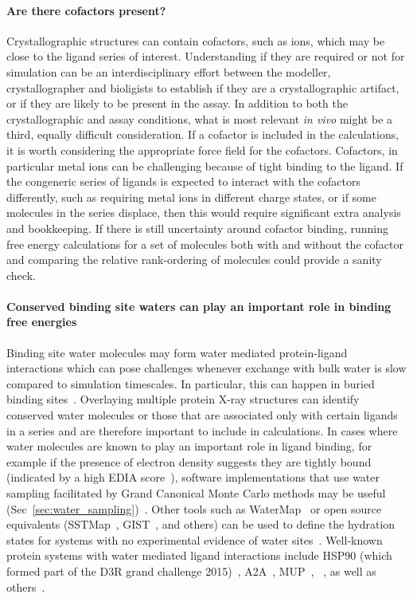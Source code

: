 \documentclass[9pt,bestpractices]{livecoms}
\begin{document}
\paragraph{Are there cofactors present?}
Crystallographic structures can contain cofactors, such as ions, which may be close to the ligand series of interest. Understanding if they are required or not for simulation can be an interdisciplinary effort between the modeller, crystallographer and bioligists to establish if they are a crystallographic artifact, or if they are likely to be present in the assay. In addition to both the crystallographic and assay conditions, what is most relevant \textit{in vivo} might be a third, equally difficult consideration. If a cofactor is included in the calculations, it is worth considering the appropriate force field for the cofactors. Cofactors, in particular metal ions can be challenging\cite{mobley2017predicting, guven2024protocols} because of tight binding to the ligand.  If the congeneric series of ligands is expected to interact with the cofactors differently, such as requiring metal ions in different charge states, or if some molecules in the series displace, then this would require significant extra analysis and bookkeeping. If there is still uncertainty around cofactor binding, running free energy calculations for a set of molecules both with and without the cofactor and comparing the relative rank-ordering of molecules could provide a sanity check.
 

\paragraph{Conserved binding site waters can play an important role in binding free energies}
Binding site water molecules may form water mediated protein-ligand interactions which can pose challenges whenever exchange with bulk water is slow compared to simulation timescales. In particular, this can happen in buried binding sites~\cite{laage2017water}. Overlaying multiple protein X-ray structures can identify conserved water molecules or those that are associated only with certain ligands in a series and are therefore important to include in calculations. In cases where water molecules are known to play an important role in ligand binding, for example if the presence of electron density suggests they are tightly bound (indicated by a high EDIA score~\cite{nittinger2015evidence,meyder2017estimating}), software implementations that use water sampling facilitated by Grand Canonical Monte Carlo methods may be useful  (Sec~\ref{sec:water_sampling})~\cite{michel2010prediction}. Other tools such as WaterMap~\cite{abel2008role,young2007motifs} or open source equivalents (SSTMap~\cite{haider2018solvation}, GIST~\cite{ramsey2016solvation}, and others) can be used to define the hydration states for systems with no experimental evidence of water sites~\cite{wang2011ligand}. Well-known protein systems with water mediated ligand interactions include HSP90 (which formed part of the D3R grand challenge 2015)~\cite{mey2016blinded}, A2A~\cite{brucemacdonald2018ligand}, MUP~\cite{ross2015water}, ~\cite{deflorian2020accurate}, as well as others~\cite{michel2009energetics}.
\end{document}
